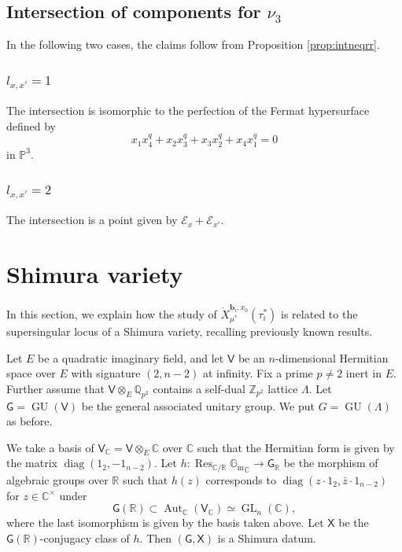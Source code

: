 \documentclass[12pt,a4paper]{article}
\DeclareMathOperator{\Aut}{Aut}
\DeclareMathOperator{\diag}{diag}
\DeclareMathOperator{\Res}{Res}
\DeclareMathOperator{\GL}{GL}
\DeclareMathOperator{\GU}{GU}
\newcommand{\bC}{\mathbb{C}}
\newcommand{\bP}{\mathbb{P}}
\newcommand{\bQ}{\mathbb{Q}}
\newcommand{\bR}{\mathbb{R}}
\newcommand{\bZ}{\mathbb{Z}}
\newcommand{\bfb}{\mathbf{b}}
\newcommand{\cE}{\mathcal{E}}
\newcommand{\sfG}{\mathsf{G}}
\newcommand{\sfV}{\mathsf{V}}
\newcommand{\sfX}{\mathsf{X}}
\newcommand{\Gm}{\mathbb{G}_{\mathrm{m}}}
\begin{document}
\subsection{Intersection of components for $\nu_3$}

In the following two cases, the claims follow from Proposition \ref{prop:intneqrr}. 

\subsubsection{$l_{x,x'}=1$}
The intersection is isomorphic to 
the perfection of the Fermat hypersurface 
defined by 
\[
 x_1 x_4^q + x_2 x_3^q + x_3 x_2^q +x_4 x_1^q =0 
\]
in $\bP^3$. 

\subsubsection{$l_{x,x'}=2$}
The intersection is a point given by $\cE_x +\cE_{x'}$. 

\section{Shimura variety}\label{sec:ShVar}
In this section, we explain how the study of $\mathring{X}_{\mu^*}^{\bfb_i,x_0}(\tau_i^*)$ is related to the supersingular locus of a Shimura variety, recalling previously known results. 

Let $E$ be a quadratic imaginary field, and let $\sfV$ be an $n$-dimensional Hermitian space over $E$ with signature $(2,n-2)$ at infinity. Fix a prime $p \neq 2$ inert in $E$. 
Further assume that $\sfV \otimes_{E} \bQ_{p^2}$ contains a self-dual $\bZ_{p^2}$ lattice $\Lambda$. Let $\sfG = \GU (\sfV)$ be the general associated unitary group. 
We put $G=\GU (\Lambda)$ as before. 

We take a basis of 
$\sfV_{\bC} = \sfV \otimes_{E} \bC$ 
over $\bC$ 
such that the Hermitian form is given by the 
matrix 
$\diag (1_2,-1_{n-2})$. 
Let $h \colon \Res_{\bC/\bR} {\Gm}_{\bC} \to \sfG_{\bR}$ be the morphism of algebraic groups over $\bR$ such that 
$h(z)$ corresponds to $\diag (z \cdot 1_2,\bar{z} \cdot 1_{n-2})$ for $z \in \bC^{\times}$ 
under 
\[
 \sfG (\bR) \subset \Aut_{\bC} (\sfV_{\bC}) \simeq 
 \GL_n(\bC) , 
\]
where the last isomorphism is given by 
the basis taken above. 
Let $\sfX$ be the $\sfG (\bR)$-conjugacy class of 
$h$. 
Then $(\sfG,\sfX)$ is a Shimura datum. 
\end{document}
